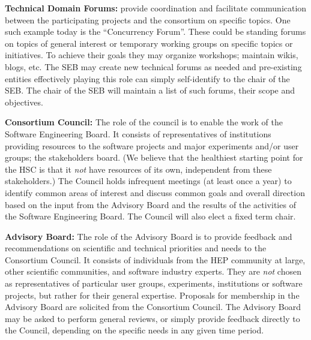 \documentclass[12pt,letterpaper,fleqn]{article}
\begin{document}
{\bf Technical Domain Forums:} provide coordination and facilitate
communication between the participating projects and the consortium
on specific topics. One such example today is the ``Concurrency Forum''.
These could be standing forums on topics of general interest or
temporary working groups on specific topics or initiatives.
To achieve their goals they may organize workshops; maintain wikis,
blogs, etc. The SEB may create new technical forums as needed and pre-existing entities effectively playing this role can simply self-identify
to the chair of the SEB. The chair of the SEB will maintain a list
of such forums, their scope and objectives.

{\bf Consortium Council:} The role of the council is to enable the
work of the Software Engineering Board.
It consists of representatives of
institutions providing resources to the software projects
and major experiments and/or user groups; the stakeholders board.
(We believe that the healthiest starting point
for the HSC is that it {\em not} have resources of its own, independent
from these stakeholders.)
The Council holds infrequent meetings (at least once a year) to 
identify common areas of interest and discuss common goals and overall
direction based on the input from the Advisory Board and the results of the activities of the Software Engineering Board. The Council will
also elect a fixed term chair. 

{\bf Advisory Board:} The role of the Advisory Board is to provide
feedback and recommendations on scientific and technical priorities
and needs to the Consortium Council. It consists of individuals from
the HEP community at large, other scientific communities, and
software industry experts. They are {\em not} chosen as representatives
of particular user groups, experiments, institutions or software
projects, but rather for their general expertise.
Proposals for membership in the Advisory Board are solicited from the Consortium Council. The Advisory Board may be asked to perform general
reviews, or simply provide feedback directly to the Council, depending
on the specific needs in any given time period. 
\end{document}

